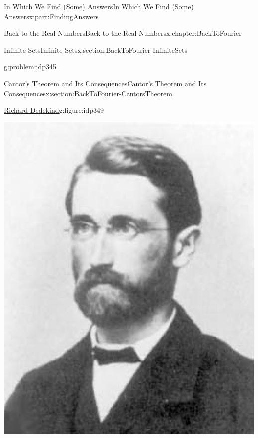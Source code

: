 \documentclass[oneside,10pt,]{book}
\numberwithin{equation}{section}
\begin{document}
\begin{partptx}{In Which We Find (Some) Answers}{}{In Which We Find (Some) Answers}{}{}{x:part:FindingAnswers}
\begin{chapterptx}{Back to the Real Numbers}{}{Back to the Real Numbers}{}{}{x:chapter:BackToFourier}
\begin{sectionptx}{Infinite Sets}{}{Infinite Sets}{}{}{x:section:BackToFourier-InfiniteSets}
\begin{problem}{}{g:problem:idp345}
\begin{enumerate}[font=\bfseries,label=(\alph*),ref=\alph*]
\end{enumerate}
\end{problem}
\end{sectionptx}
%
%
\typeout{************************************************}
\typeout{************************************************}
%
\begin{sectionptx}{Cantor's Theorem and Its Consequences}{}{Cantor's Theorem and Its Consequences}{}{}{x:section:BackToFourier-CantorsTheorem}
\begin{figureptx}{\href{https://mathshistory.st-andrews.ac.uk/Biographies/Dedekind/}{Richard Dedekind}\protect\footnotemark{}}{g:figure:idp349}{}%
%
\begin{image}{0.325}{0.35}{0.325}%
\includegraphics[width=\linewidth]{images/Dedekind.png}
\end{image}%
\tcblower
\end{figureptx}%
%

\end{sectionptx}
\end{chapterptx}
\end{partptx}
\end{document}
